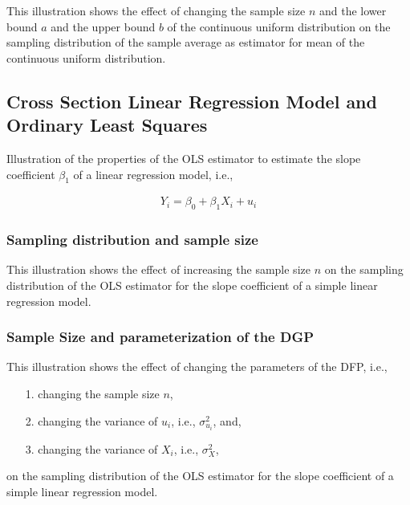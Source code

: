 \documentclass{article}
\begin{document}

This illustration shows the effect of changing the sample size $n$ and the lower bound $a$ and the upper bound $b$ of the continuous uniform distribution on the sampling distribution of the sample average as estimator for mean of the continuous uniform distribution.

\subsection{Cross Section Linear Regression Model and Ordinary Least Squares}

Illustration of the properties of the OLS estimator to estimate the slope coefficient $\beta_{1}$ of a linear regression model, i.e.,

\begin{align}
	Y_{i} = \beta_{0} + \beta_{1} X_{i} + u_{i}
\end{align}

\subsubsection{Sampling distribution and sample size}


This illustration shows the effect of increasing the sample size $n$ on the sampling distribution of the OLS estimator for the slope coefficient of a simple linear regression model.

\subsubsection{Sample Size and parameterization of the DGP}


This illustration shows the effect of changing the parameters of the DFP, i.e.,  

\begin{itemize}
	\item[1.] changing the sample size $n$,
	\item[2.] changing the variance of $u_{i}$, i.e., $\sigma_{u_{i}}^{2}$, and,
	\item[3.] changing the variance of $X_{i}$, i.e., $\sigma_{X}^{2}$, 
\end{itemize}

on the sampling distribution of the OLS estimator for the slope coefficient of a simple linear regression model.
\end{document}
